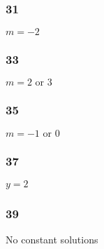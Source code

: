 \documentclass{article}
\begin{document}
\subsubsection{31}

$m = -2$

\subsubsection{33}

$m = 2 \text{ or } 3$

\subsubsection{35}

$m = -1 \text{ or } 0$

\subsubsection{37}

$y = 2$

\subsubsection{39}

No constant solutions
\end{document}
